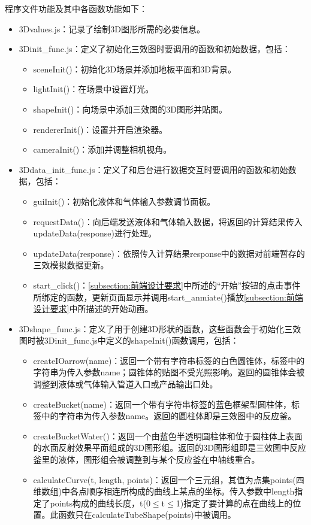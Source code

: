 \documentclass[a4paper]{ctexart}
\begin{document}
\begin{spacing}{1.25}
程序文件功能及其中各函数功能如下：
\begin{itemize}
	\item 3Dvalues.js：记录了绘制3D图形所需的必要信息。
	\item 3Dinit\_func.js：定义了初始化三效图时要调用的函数和初始数据，包括：
	\begin{itemize}
		\item sceneInit()：初始化3D场景并添加地板平面和3D背景。
		\item lightInit()：在场景中设置灯光。
		\item shapeInit()：向场景中添加三效图的3D图形并贴图。
		\item rendererInit()：设置并开启渲染器。
		\item cameraInit()：添加并调整相机视角。
	\end{itemize}
	\item 3Ddata\_init\_func.js：定义了和后台进行数据交互时要调用的函数和初始数据，包括：
	\begin{itemize}
		\item guiInit()：初始化液体和气体输入参数调节面板。
		\item requestData()：向后端发送液体和气体输入数据，将返回的计算结果传入updateData(response)进行处理。
		\item updateData(response)：依照传入计算结果response中的数据对前端暂存的三效模拟数据更新。
		\item start\_click()：\ref{subsection:前端设计要求}中所述的“开始”按钮的点击事件所绑定的函数，更新页面显示并调用start\_anmiate()播放\ref{subsection:前端设计要求}中所描述的开始动画。
	\end{itemize}
	\item 3Dshape\_func.js：定义了用于创建3D形状的函数，这些函数会于初始化三效图时被3Dinit\_func.js中定义的shapeInit()函数调用，包括：
	\begin{itemize}
		\item createIOarrow(name)：返回一个带有字符串标签的白色圆锥体，标签中的字符串为传入参数name；圆锥体的贴图不受光照影响。返回的圆锥体会被调整到液体或气体输入管道入口或产品输出口处。
		\item createBucket(name)：返回一个带有字符串标签的蓝色框架型圆柱体，标签中的字符串为传入参数name。返回的圆柱体即是三效图中的反应釜。
		\item createBucketWater()：返回一个由蓝色半透明圆柱体和位于圆柱体上表面的水面反射效果平面组成的3D图形组。返回的3D图形组即是三效图中反应釜里的液体，图形组会被调整到与某个反应釜在中轴线重合。
		\item calculateCurve(t, length, points)：返回一个三元组，其值为点集points(四维数组)中各点顺序相连所构成的曲线上某点的坐标。传入参数中length指定了points构成的曲线长度，t(0$\leq$t$\leq$1)指定了要计算的点在曲线上的位置。此函数只在calculateTubeShape(points)中被调用。

\end{itemize}
\end{itemize}
\end{spacing}
\end{document}
